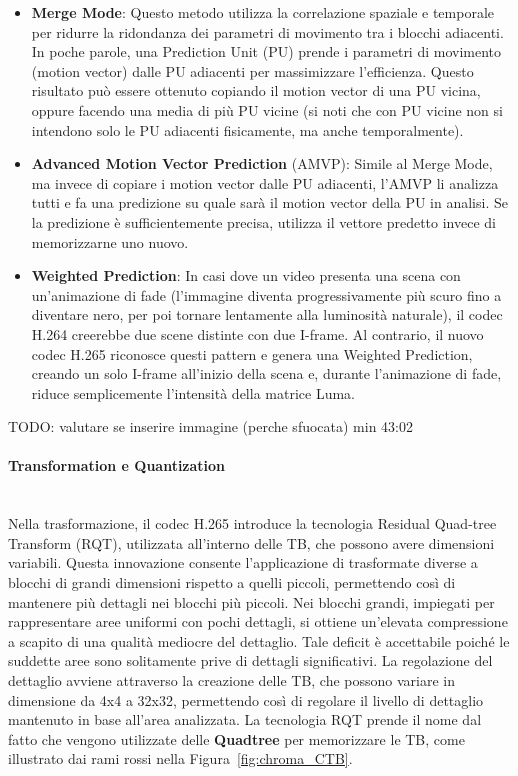 \documentclass[a4paper,12pt, oneside]{article}
\begin{document}
\begin{itemize}
    \item \textbf{Merge Mode}: Questo metodo utilizza la correlazione spaziale e temporale per ridurre la
    ridondanza dei parametri di movimento tra i blocchi adiacenti. In poche parole, una Prediction Unit
    (PU) prende i parametri di movimento (motion vector) dalle PU adiacenti per massimizzare l'efficienza.
    Questo risultato può essere ottenuto copiando il motion vector di una PU vicina, oppure facendo una
    media di più PU vicine (si noti che con PU vicine non si intendono solo le PU adiacenti fisicamente, ma
    anche temporalmente).
    
    \item \textbf{Advanced Motion Vector Prediction} (AMVP): Simile al Merge Mode, ma invece di copiare i
    motion vector dalle PU adiacenti, l'AMVP li analizza tutti e fa una predizione su quale sarà il motion
    vector della PU in analisi. Se la predizione è sufficientemente precisa, utilizza il vettore predetto
    invece di memorizzarne uno nuovo.
    
    \item \textbf{Weighted Prediction}: In casi dove un video presenta una scena con un'animazione di fade
    (l'immagine diventa progressivamente più scuro fino a diventare nero, per poi tornare lentamente alla
    luminosità naturale), il codec H.264 creerebbe due scene distinte con due I-frame. Al contrario, il
    nuovo codec H.265 riconosce questi pattern e genera una Weighted Prediction, creando un solo I-frame
    all'inizio della scena e, durante l'animazione di fade, riduce semplicemente l'intensità della matrice
    Luma.
\end{itemize}

TODO: valutare se inserire immagine (perche sfuocata) min 43:02

\paragraph{Transformation e Quantization}\hphantom{A}\\
Nella trasformazione, il codec H.265 introduce la tecnologia Residual Quad-tree Transform (RQT), utilizzata
all'interno delle TB, che possono avere dimensioni variabili. Questa innovazione consente l'applicazione di
trasformate diverse a blocchi di grandi dimensioni rispetto a quelli piccoli, permettendo così di mantenere
più dettagli nei blocchi più piccoli. Nei blocchi grandi, impiegati per rappresentare aree uniformi con
pochi dettagli, si ottiene un'elevata compressione a scapito di una qualità mediocre del dettaglio. Tale
deficit è accettabile poiché le suddette aree sono solitamente prive di dettagli significativi. La
regolazione del dettaglio avviene attraverso la creazione delle TB, che possono variare in dimensione
da 4x4 a 32x32, permettendo così di regolare il livello di dettaglio mantenuto in base all'area analizzata.
La tecnologia RQT prende il nome dal fatto che vengono utilizzate delle \textbf{Quadtree} per memorizzare
le TB, come illustrato dai rami rossi nella Figura~\ref{fig:chroma_CTB}.
\end{document}
